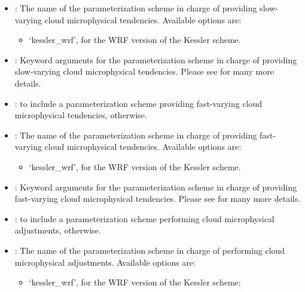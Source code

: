 \documentclass[letterpaper,10pt,english]{sphinxmanual}
\begin{document}
\begin{description}
\begin{itemize}
\item {} 
: The name of the parameterization scheme in charge of              providing slow-varying cloud microphysical tendencies. Available options are:
\begin{itemize}
\item {} 
‘kessler\_wrf’, for the WRF version of the Kessler scheme.

\end{itemize}

\item {} 
: Keyword arguments for the parameterization scheme               in charge of providing slow-varying cloud microphysical tendencies. Please see           for many more details.

\item {} 
:  to include a parameterization scheme            providing fast-varying cloud microphysical tendencies,  otherwise.

\item {} 
: The name of the parameterization scheme in charge of              providing fast-varying cloud microphysical tendencies. Available options are:
\begin{itemize}
\item {} 
‘kessler\_wrf’, for the WRF version of the Kessler scheme.

\end{itemize}

\item {} 
: Keyword arguments for the parameterization scheme               in charge of providing fast-varying cloud microphysical tendencies. Please see           for many more details.

\item {} 
:  to include a parameterization scheme               performing cloud microphysical adjustments,  otherwise.

\item {} 
: The name of the parameterization scheme in charge            of performing cloud microphysical adjustments. Available options are:
\begin{itemize}
\item {} 
‘kessler\_wrf’, for the WRF version of the Kessler scheme;


\end{itemize}
\end{itemize}
\end{description}
\end{document}
